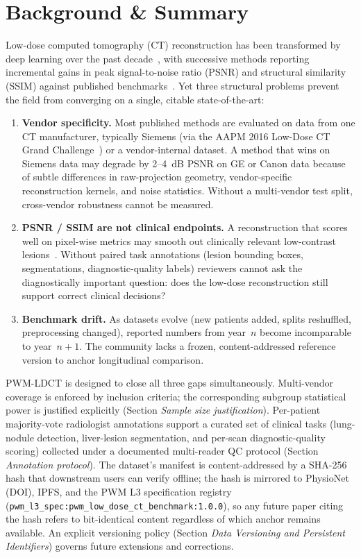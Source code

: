 \documentclass[twoside,11pt]{article}
\begin{document}
\section*{Background \& Summary}

Low-dose computed tomography (CT) reconstruction has been transformed by deep learning over the past decade~\citep{chen2017redcnn,wang2020deeplearningreview}, with successive methods reporting incremental gains in peak signal-to-noise ratio (PSNR) and structural similarity (SSIM) against published benchmarks~\citep{aapm2016challenge}. Yet three structural problems prevent the field from converging on a single, citable state-of-the-art:

\begin{enumerate}
    \item \textbf{Vendor specificity.} Most published methods are evaluated on data from one CT manufacturer, typically Siemens (via the AAPM 2016 Low-Dose CT Grand Challenge~\citep{aapm2016challenge}) or a vendor-internal dataset. A method that wins on Siemens data may degrade by 2--4~dB PSNR on GE or Canon data because of subtle differences in raw-projection geometry, vendor-specific reconstruction kernels, and noise statistics. Without a multi-vendor test split, cross-vendor robustness cannot be measured.
    \item \textbf{PSNR / SSIM are not clinical endpoints.} A reconstruction that scores well on pixel-wise metrics may smooth out clinically relevant low-contrast lesions~\citep{kim2019smoothing}. Without paired task annotations (lesion bounding boxes, segmentations, diagnostic-quality labels) reviewers cannot ask the diagnostically important question: does the low-dose reconstruction still support correct clinical decisions?
    \item \textbf{Benchmark drift.} As datasets evolve (new patients added, splits reshuffled, preprocessing changed), reported numbers from year~$n$ become incomparable to year~$n+1$. The community lacks a frozen, content-addressed reference version to anchor longitudinal comparison.
\end{enumerate}

PWM-LDCT is designed to close all three gaps simultaneously. Multi-vendor coverage is enforced by inclusion criteria; the corresponding subgroup statistical power is justified explicitly (Section \textit{Sample size justification}). Per-patient majority-vote radiologist annotations support a curated set of clinical tasks (lung-nodule detection, liver-lesion segmentation, and per-scan diagnostic-quality scoring) collected under a documented multi-reader QC protocol (Section \textit{Annotation protocol}). The dataset's manifest is content-addressed by a SHA-256 hash that downstream users can verify offline; the hash is mirrored to PhysioNet (DOI), IPFS, and the PWM L3 specification registry (\texttt{pwm\_l3\_spec:pwm\_low\_dose\_ct\_benchmark:1.0.0}), so any future paper citing the hash refers to bit-identical content regardless of which anchor remains available. An explicit versioning policy (Section \textit{Data Versioning and Persistent Identifiers}) governs future extensions and corrections.
\end{document}
